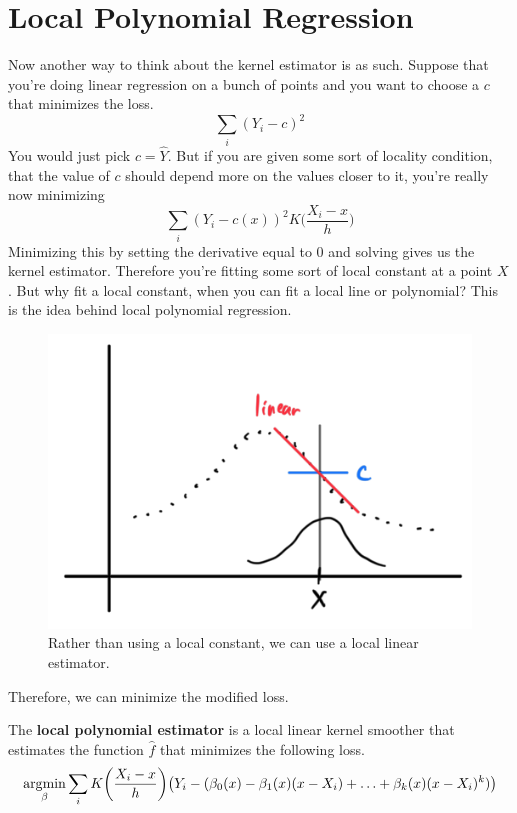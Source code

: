 \section{Local Polynomial Regression}

  Now another way to think about the kernel estimator is as such. Suppose that you're doing linear regression on a bunch of points and you want to choose a $c$ that minimizes the loss. 
  \begin{equation}
    \sum_i (Y_i - c)^2
  \end{equation}
  You would just pick $c = \hat{Y}$. But if you are given some sort of locality condition, that the value of $c$ should depend more on the values closer to it, you're really now minimizing 
  \begin{equation}
    \sum_i (Y_i - c(x))^2 K \bigg( \frac{X_i - x}{h} \bigg)
  \end{equation}
  Minimizing this by setting the derivative equal to $0$ and solving gives us the kernel estimator. Therefore you're fitting some sort of local constant at a point $X$. But why fit a local constant, when you can fit a local line or polynomial? This is the idea behind local polynomial regression.

  \begin{figure}[H]
    \centering 
    \includegraphics[scale=0.4]{img/local_linear_estimator.png}
    \caption{Rather than using a local constant, we can use a local linear estimator.} 
    \label{fig:local_linear_estimator}
  \end{figure}

  Therefore, we can minimize the modified loss. 

  \begin{definition}
    The \textbf{local polynomial estimator} is a local linear kernel smoother that estimates the function $\hat{f}$ that minimizes the following loss. 
    \begin{equation}
      \argmin_{\beta} \sum_i K \bigg( \frac{X_i - x}{h} \bigg) \big( Y_i - (\beta_0 (x) - \beta_1 (x) (x- X_i) + \ldots + \beta_k (x) (x - X_i)^k )\big)
    \end{equation}
  \end{definition}

